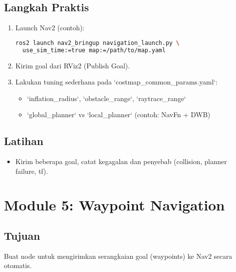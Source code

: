 \documentclass[12pt,a4paper]{article}
\begin{document}
\subsection*{Langkah Praktis}
\begin{enumerate}
    \item Launch Nav2 (contoh):
          \begin{lstlisting}[language=bash]
ros2 launch nav2_bringup navigation_launch.py \
  use_sim_time:=true map:=/path/to/map.yaml
\end{lstlisting}
    \item Kirim goal dari RViz2 (Publish Goal).
    \item Lakukan tuning sederhana pada `costmap_common_params.yaml`:
          \begin{itemize}
              \item `inflation_radius`, `obstacle_range`, `raytrace_range`
              \item `global_planner` vs `local_planner` (contoh: NavFn + DWB)
          \end{itemize}
\end{enumerate}

\subsection*{Latihan}
\begin{itemize}
    \item Kirim beberapa goal, catat kegagalan dan penyebab (collision, planner failure, tf).
\end{itemize}

\newpage
\section{Module 5: Waypoint Navigation}
\subsection*{Tujuan}
Buat node untuk mengirimkan serangkaian goal (waypoints) ke Nav2 secara otomatis.
\end{document}
